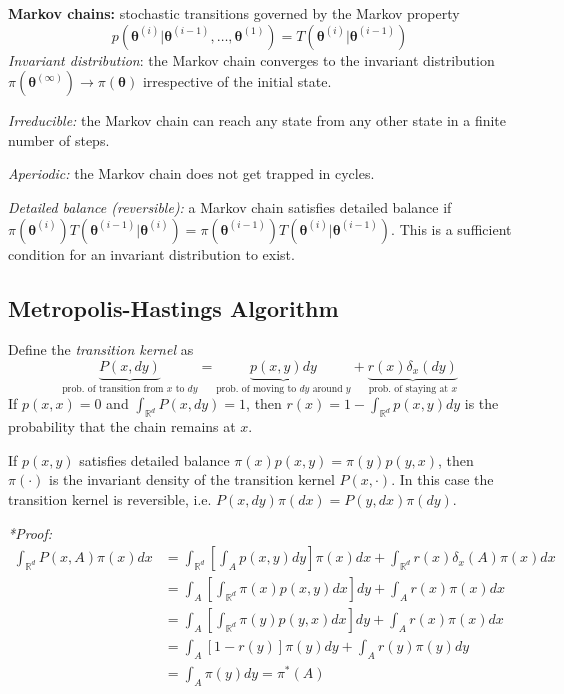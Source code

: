 \documentclass[12pt]{article}
\begin{document}
\textbf{Markov chains:} stochastic transitions governed by the Markov property
$$
p(\boldsymbol{\theta}^{(i)} | \boldsymbol{\theta}^{(i-1)}, \dots, \boldsymbol{\theta}^{(1)}) = T(\boldsymbol{\theta}^{(i)} | \boldsymbol{\theta}^{(i-1)})
$$
\textit{Invariant distribution}: the Markov chain converges to the invariant distribution $\pi(\boldsymbol{\theta}^{(\infty)}) \to \pi(\boldsymbol{\theta})$ irrespective of the initial state.

\textit{Irreducible:} the Markov chain can reach any state from any other state in a finite number of steps.

\textit{Aperiodic:} the Markov chain does not get trapped in cycles.

\textit{Detailed balance (reversible):} a Markov chain satisfies detailed balance if $\pi(\boldsymbol{\theta}^{(i)}) T(\boldsymbol{\theta}^{(i-1)} | \boldsymbol{\theta}^{(i)}) = \pi(\boldsymbol{\theta}^{(i-1)}) T(\boldsymbol{\theta}^{(i)} | \boldsymbol{\theta}^{(i-1)})$.
This is a sufficient condition for an invariant distribution to exist.

\subsection{Metropolis-Hastings Algorithm}
Define the \textit{transition kernel} as
$$
\underbrace{P(x, dy)}_{\text{prob. of transition from } x \text{ to } dy} = \underbrace{p(x,y) dy}_{\text{prob. of moving to $dy$ around $y$}} + \underbrace{r(x) \delta_x(dy)}_{\text{prob. of staying at } x}
$$
If $p(x, x) = 0$ and $\int_{\mathbb{R}^d} P(x,dy) = 1$, then $r(x) = 1 - \int_{\mathbb{R}^d} p(x,y) dy$ is the probability that the chain remains at $x$.

If $p(x,y)$ satisfies detailed balance $\pi(x)p(x,y) = \pi(y)p(y,x)$, then $\pi(\cdot)$ is the invariant density of the transition kernel $P(x, \cdot)$. In this case the transition kernel is reversible, i.e. $P(x, dy) \pi(dx) = P(y, dx) \pi(dy)$.

\textit{*Proof:} 
\begin{align*}
\int_{\mathbb{R}^d} P(x, A)\pi(x)  dx &= \int_{\mathbb{R}^d} \left[\int_A p(x,y)dy\right] \pi(x) dx + \int_{\mathbb{R}^d} r(x) \delta_x(A) \pi(x) dx \\
&= \int_A  \left[\int_{\mathbb{R}^d} \pi(x) p(x,y) dx\right] dy + \int_A r(x) \pi(x) dx \\
&= \int_A  \left[\int_{\mathbb{R}^d} \pi(y) p(y,x) dx\right] dy + \int_A r(x) \pi(x) dx \\
&= \int_A [1 - r(y)] \pi(y) dy + \int_A r(y) \pi(y) dy \\
&= \int_A \pi(y) dy = \pi^*(A)
\end{align*}
\end{document}
